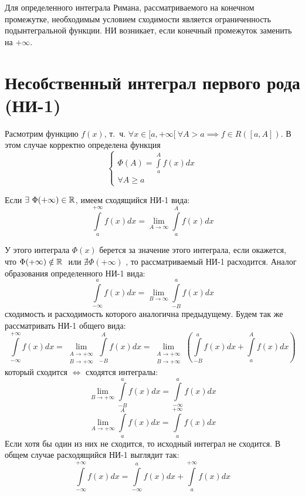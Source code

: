 \documentclass[../../main.tex]{subfiles}
\begin{document}
Для определенного интеграла Римана, рассматриваемого на конечном промежутке,
необходимым условием сходимости является ограниченность подынтегральной 
функции.
НИ возникает, если конечный промежуток заменить на $+\infty$.

\section{Несобственный интеграл первого рода (НИ-1)}

Расмотрим функцию $f(x)$, т.~ч.
$\forall x \in [a, +\infty[ \ \forall A > a \implies f \in R([a, A])$.
В этом случае корректно определена функция
\begin{equation}
    \label{7:1}
    \begin{cases}
        \Phi(A) = \int\limits_a^A f(x)dx\\
        \forall A \geq a
    \end{cases}
\end{equation}

Если $\exists \ \Phi(+\infty) \in \mathbb{R}$, имеем сходящийся НИ-1 вида:
\begin{equation}
    \label{7:2}
    \int\limits_a^{+\infty} f(x)dx =
    \lim\limits_{A \to \infty} \int\limits_a^A f(x)dx
\end{equation}

У этого интеграла $\Phi(x)$ берется за значение этого интеграла, если окажется,
что $\Phi(+\infty) \\ \notin \mathbb{R} \ $ или $ \nexists \Phi(+\infty)$
, то рассматриваемый НИ-1 расходится.
Аналог образования определенного НИ-1 вида:
\[\int\limits_{-\infty}^a f(x)dx =
\lim\limits_{B \to \infty} \int\limits_{-B}^a f(x)dx \]
сходимость и расходимость которого аналогична предыдущему.
Будем так же рассматривать НИ-1 общего вида:
\[ \int\limits_{-\infty}^{+\infty} f(x)dx =
\lim\limits_{\substack{A \to +\infty \\ B \to +\infty}}
\int\limits_{-B}^A f(x)dx =
\lim\limits_{\substack{A \to +\infty \\ B \to +\infty}}
\left( \int\limits_{-B}^a f(x)dx + \int\limits_a^{A} f(x)dx \right) \]
который сходится $\iff$ сходятся интегралы:
\[ \lim\limits_{B \to +\infty} \int\limits_{-B}^a f(x)dx
= \int\limits_{-\infty}^a f(x)dx \]
\[\lim\limits_{A \to +\infty} \int\limits_a^{A} f(x)dx
= \int\limits_a^{+\infty} f(x)dx \]
Если хотя бы один из них не сходится, то исходный интеграл не сходится.
В общем случае расходящийся НИ-1 выглядит так:
\[ \int\limits_{-\infty}^{+\infty} f(x)dx  = \int\limits_{-\infty}^a f(x)dx
+ \int\limits_a^{+\infty} f(x)dx\]
\end{document}
